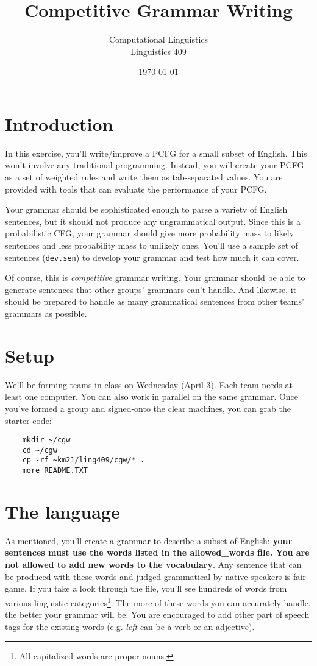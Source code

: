 \documentclass[12pt]{article}
\title{Competitive Grammar Writing}
\author{
        Computational Linguistics\\
        Linguistics 409
}
\date{\today}
\begin{document}
\maketitle

\section*{Introduction}

In this exercise, you'll write/improve a PCFG for a small subset of English.  This won't involve any traditional programming. Instead, you will create your PCFG as a set of weighted rules and write them as tab-separated values.  You are provided with tools that can evaluate the performance of your PCFG.

Your grammar should be sophisticated enough to parse a variety of English sentences, but it should not produce any ungrammatical output. Since this is a probabilistic CFG, your grammar should give more probability mass to likely sentences and less probability mass to unlikely ones. You'll use a sample set of sentences (\verb+dev.sen+) to develop your grammar and test how much it can cover.

Of course, this is \emph{competitive} grammar writing. Your grammar should be able to generate sentences that other groups' grammars can't handle. And likewise, it should be prepared to handle as many grammatical sentences from other teams' grammars as possible.

\section*{Setup}
We'll be forming teams in class on Wednesday (April 3). Each team needs at least one computer.  You can also work in parallel on the same grammar.  Once you've formed a group and signed-onto the clear machines, you can grab the starter code:

\begin{verbatim}
	mkdir ~/cgw
	cd ~/cgw
	cp -rf ~km21/ling409/cgw/* .
	more README.TXT
\end{verbatim}

\section*{The language}

As mentioned, you'll create a grammar to describe a subset of English:  \textbf{your sentences must use the words listed in the allowed\_words file. You are not allowed to add new words to the vocabulary}. Any sentence that can be produced with these words and judged grammatical by native speakers is fair game. If you take a look through the file, you'll see hundreds of words from various linguistic categories\footnote{All capitalized words are proper nouns.}. The more of these words you can accurately handle, the better your grammar will be. You are encouraged to add other part of speech tags for the existing words (e.g. \emph{left} can be a verb or an adjective).
\end{document}
